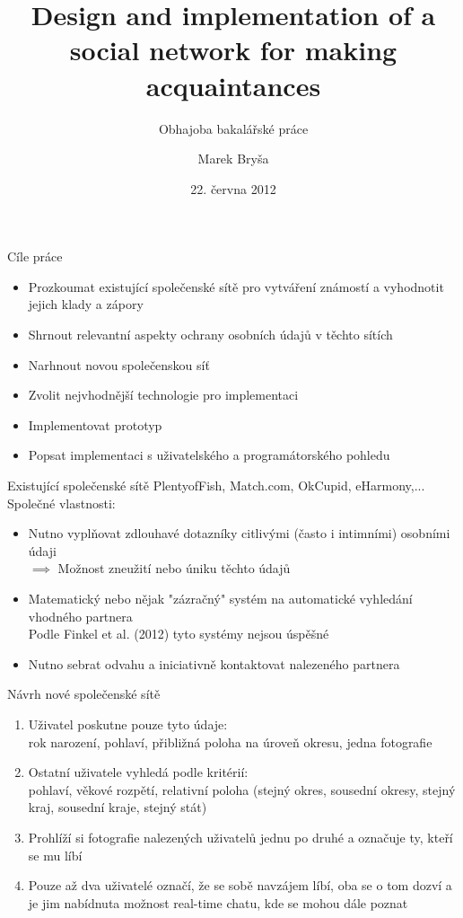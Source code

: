 \documentclass[xcolor=dvipsnames]{beamer}
\title{Design and implementation of a social network for making acquaintances}
\subtitle{Obhajoba bakalářské práce}
\author{Marek Bryša}
\date{22. června 2012}
\institute
{
Masarykova Univerzita\\
Fakulta informatiky
}
\begin{document}
  \frame{\titlepage}
	\begin{frame}{Cíle práce}
		\begin{itemize}
			\item Prozkoumat existující společenské sítě pro vytváření známostí a vyhodnotit jejich klady a zápory
			\item Shrnout relevantní aspekty ochrany osobních údajů v těchto sítích
			\item Narhnout novou společenskou síť
			\item Zvolit nejvhodnější technologie pro implementaci
			\item Implementovat prototyp
			\item Popsat implementaci s uživatelského a programátorského pohledu
		\end{itemize}
	\end{frame}
	\begin{frame}{Existující společenské sítě}
		PlentyofFish, Match.com, OkCupid, eHarmony,...\\
		\bigskip
		Společné vlastnosti:
		\begin{itemize}
			\item Nutno vyplňovat zdlouhavé dotazníky citlivými (často i intimními) osobními údaji\\
				$\implies$ Možnost zneužití nebo úniku těchto údajů
			\item Matematický nebo nějak "zázračný" systém na automatické vyhledání vhodného partnera\\
				Podle Finkel et al. (2012) tyto systémy nejsou úspěšné
			\item Nutno sebrat odvahu a iniciativně kontaktovat nalezeného partnera\\
				
		\end{itemize}
	\end{frame}
	\begin{frame}{Návrh nové společenské sítě}
		\begin{enumerate}
			\item Uživatel poskutne pouze tyto údaje:\\
		    rok narození, pohlaví, přibližná poloha na úroveň okresu, jedna fotografie
	    \item Ostatní uživatele vyhledá podle kritérií:\\
	      pohlaví, věkové rozpětí, relativní poloha (stejný okres, sousední okresy, stejný kraj, sousední kraje, stejný stát)
	    \item Prohlíží si fotografie nalezených uživatelů jednu po druhé a označuje ty, kteří se mu líbí
	    \item Pouze až dva uživatelé označí, že se sobě navzájem líbí, oba se o tom dozví a je jim nabídnuta možnost real-time chatu, kde se mohou dále poznat
		\end{enumerate}
	\end{frame}
\end{document}

